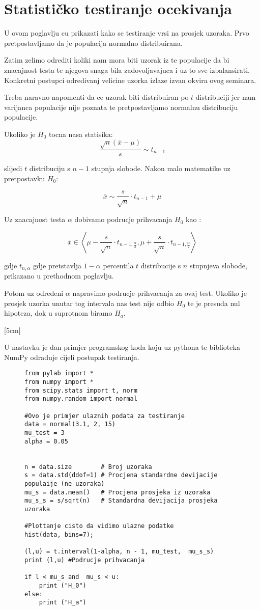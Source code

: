 \chapter{Statističko testiranje ocekivanja}

U ovom poglavlju cu prikazati kako se testiranje vrsi na prosjek uzoraka. Prvo pretpostavljamo da je populacija normalno distribuirana.

Zatim zelimo odrediti koliki nam mora biti uzorak iz te populacije da bi znacajnost testa te njegova snaga bila zadovoljavajuca i uz to sve izbalansirati. Konkretni postupci odredivanj velicine uzorka izlaze izvan okvira ovog seminara.

Treba naravno napomenti da ce uzorak biti distribuiran po $t$ distribuciji jer nam varijanca populacije nije poznata te pretpostavljamo normalnu distribuciju populacije.

Ukoliko je $H_0$ tocna nasa statisika: \[\frac{\sqrt{n} (\bar{x} - \mu)}{s} \sim t_{n-1}\]

slijedi $t$ distribuciju s $n-1$ stupnja slobode. Nakon malo matematike uz pretpostavku $H_0$:

\[
\bar{x} \sim \frac{s}{\sqrt{n}} \cdot t_{n-1} + \mu
\]

Uz znacajnost testa $\alpha$ dobivamo podrucje prihvacanja $H_0$ kao \cite{matstat}:

\[
\bar{x} \in \left<\mu - \frac{s}{\sqrt{n}} \cdot t_{n-1, \frac{\alpha}{2}}, \mu + \frac{s}{\sqrt{n}} \cdot t_{n-1, \frac{\alpha}{2}} \right>
\]

gdje $t_{n, \alpha}$ gdje pretstavlja $1-\alpha$ percentila $t$ distribucije s $n$ stupnjeva slobode, prikazano u prethodnom poglavlju.

Potom uz odredeni $\alpha$ napravimo podrucje prihvacanja za ovaj test. Ukoliko je prosjek uzorka unutar tog intervala nas test nije odbio $H_0$ te je presuda nul hipoteza, dok u suprotnom biramo $H_a$.

[5cm]

U nastavku je dan primjer programskog koda koju uz pythona te biblioteka NumPy odraduje cijeli postupak testiranja.

\begin{figure}[H]
\begin{verbatim}
from pylab import *
from numpy import *
from scipy.stats import t, norm
from numpy.random import normal

#Ovo je primjer ulaznih podata za testiranje
data = normal(3.1, 2, 15)
mu_test = 3
alpha = 0.05


n = data.size        # Broj uzoraka
s = data.std(ddof=1) # Procjena standardne devijacije populaije (ne uzoraka)
mu_s = data.mean()   # Procjena prosjeka iz uzoraka
mu_s_s = s/sqrt(n)   # Standardna devijacija prosjeka uzoraka

#Plottanje cisto da vidimo ulazne podatke
hist(data, bins=7);

(l,u) = t.interval(1-alpha, n - 1, mu_test,  mu_s_s)
print (l,u) #Podrucje prihvacanja

if l < mu_s and  mu_s < u:
    print ("H_0")
else:
    print ("H_a")
\end{verbatim}
\end{figure}